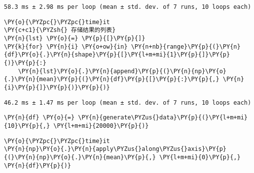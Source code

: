     \begin{Verbatim}[commandchars=\\\{\}]
58.3 ms ± 2.98 ms per loop (mean ± std. dev. of 7 runs, 10 loops each)
    \end{Verbatim}

    \begin{tcolorbox}[breakable, size=fbox, boxrule=1pt, pad at break*=1mm,colback=cellbackground, colframe=cellborder]
\begin{Verbatim}[commandchars=\\\{\}]
\PY{o}{\PYZpc{}\PYZpc{}time}it
\PY{c+c1}{\PYZsh{} 存储结果的列表}
\PY{n}{lst} \PY{o}{=} \PY{p}{[}\PY{p}{]}
\PY{k}{for} \PY{n}{i} \PY{o+ow}{in} \PY{n+nb}{range}\PY{p}{(}\PY{n}{df}\PY{o}{.}\PY{n}{shape}\PY{p}{[}\PY{l+m+mi}{1}\PY{p}{]}\PY{p}{)}\PY{p}{:}
    \PY{n}{lst}\PY{o}{.}\PY{n}{append}\PY{p}{(}\PY{n}{np}\PY{o}{.}\PY{n}{mean}\PY{p}{(}\PY{n}{df}\PY{p}{[}\PY{p}{:}\PY{p}{,} \PY{n}{i}\PY{p}{]}\PY{p}{)}\PY{p}{)}
\end{Verbatim}
\end{tcolorbox}

    \begin{Verbatim}[commandchars=\\\{\}]
46.2 ms ± 1.47 ms per loop (mean ± std. dev. of 7 runs, 10 loops each)
    \end{Verbatim}

    \begin{tcolorbox}[breakable, size=fbox, boxrule=1pt, pad at break*=1mm,colback=cellbackground, colframe=cellborder]
\begin{Verbatim}[commandchars=\\\{\}]
\PY{n}{df} \PY{o}{=} \PY{n}{generate\PYZus{}data}\PY{p}{(}\PY{l+m+mi}{10}\PY{p}{,} \PY{l+m+mi}{20000}\PY{p}{)}
\end{Verbatim}
\end{tcolorbox}

    \begin{tcolorbox}[breakable, size=fbox, boxrule=1pt, pad at break*=1mm,colback=cellbackground, colframe=cellborder]
\begin{Verbatim}[commandchars=\\\{\}]
\PY{o}{\PYZpc{}\PYZpc{}time}it
\PY{n}{np}\PY{o}{.}\PY{n}{apply\PYZus{}along\PYZus{}axis}\PY{p}{(}\PY{n}{np}\PY{o}{.}\PY{n}{mean}\PY{p}{,} \PY{l+m+mi}{0}\PY{p}{,} \PY{n}{df}\PY{p}{)}
\end{Verbatim}
\end{tcolorbox}

